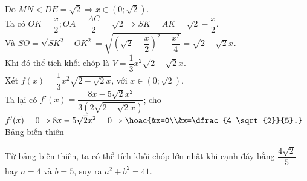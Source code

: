 \begin{bt}
{		Do  $MN < DE=\sqrt{2} \Rightarrow x \in \left(0; \sqrt{2}\right) $.\\
		Ta có $OK=\dfrac{x}{2}; OA=\dfrac{AC}{2}=\sqrt{2} \Rightarrow SK=A K=\sqrt{2}-\dfrac{x}{2}$.\\ 
		Và  $SO=\sqrt{SK^2-OK^2}=\sqrt{\left(\sqrt{2}-\dfrac{x}{2}\right)^2-\dfrac{x^2}{4}}=\sqrt{2-\sqrt{2} x}$.\\
		Khi đó thể tích khối chóp là  $V=\dfrac{1}{3} x^2 \sqrt{2-\sqrt{2} x}$.\\
		Xét $f(x)=\dfrac{1}{3} x^2  \sqrt{2-\sqrt{2} x}$, với $x\in \left(0;\sqrt{2}\right) $.\\
		Ta lại có $f'(x)=\dfrac{8 x-5 \sqrt{2} x^2}{3\left(2  \sqrt{2-\sqrt{2} x}\right)}$; cho $f'(x)=0 \Rightarrow 8 x-5 \sqrt{2} x^2=0 \Rightarrow \hoac{&x=0\\&x=\dfrac{4 \sqrt{2}}{5}.}$\\
		 Bảng biến thiên
		\begin{center}
		\end{center}
		Từ bảng biến thiên, ta có thể tích khối chóp lớn nhất khi cạnh đáy bằng $\dfrac{4 \sqrt{2}}{5}$ hay $a=4$ và  $b=5$, suy ra $a^2+b^2=41$.
	 }
\end{bt}

